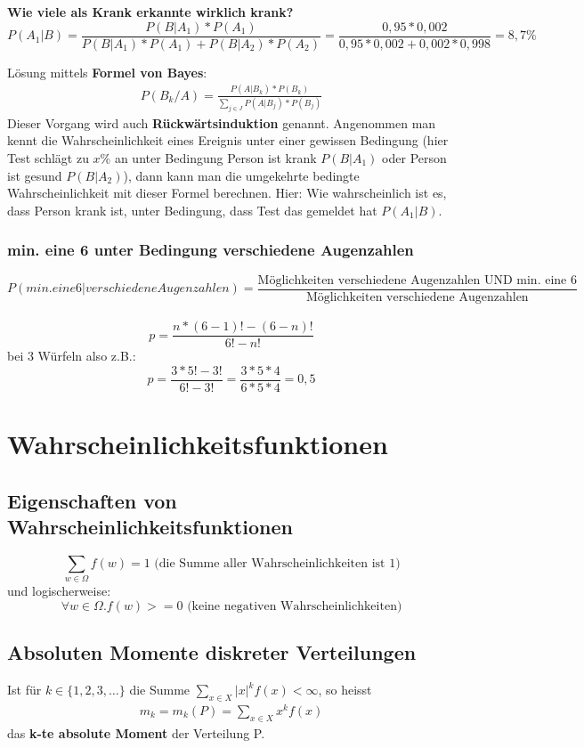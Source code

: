 \documentclass{article}
\begin{document}
	\textbf{Wie viele als Krank erkannte wirklich krank?}\\
	\[
	P(A_1 | B ) = \frac{P(B|A_1)*P(A_1)}
	{P(B|A_1)*P(A_1)+P(B| A_2)*P(A_2)} =
	\frac{0,95*0,002}{0,95*0,002+0,002*0,998} = 8,7\%
	\]
	
	\vspace*{10pt}
	
	Lösung mittels \textbf{Formel von Bayes}:
	\begin{align}
	P(B_k/A) = \frac{P(A|B_k) * P(B_k)}{\sum_{j \in J} P(A|B_j) * P(B_j)}
	\end{align}
	Dieser Vorgang wird auch \textbf{Rückwärtsinduktion} genannt. Angenommen man
	kennt die Wahrscheinlichkeit eines Ereignis unter einer gewissen Bedingung (hier Test
	schlägt zu $x\%$ an unter Bedingung Person ist krank $P(B|A_1)$ oder Person ist gesund
	$P(B|A_2)$), dann kann man die umgekehrte bedingte Wahrscheinlichkeit
	mit dieser Formel berechnen. Hier: Wie wahrscheinlich ist es, dass Person krank ist, unter
	Bedingung, dass Test das gemeldet hat $P(A_1|B)$.
	
	\subsubsection{min. eine 6 unter Bedingung verschiedene Augenzahlen}
	\[
	P(min. eine 6|verschiedene Augenzahlen) = \frac{\text{Möglichkeiten verschiedene Augenzahlen UND min. eine 6}}{\text{Möglichkeiten verschiedene Augenzahlen}}
	\]\\
	\[
	p=\frac{n*(6-1)!-(6-n)!}{6!-n!} 
	\]
	bei 3 Würfeln also z.B.:\[
	p=\frac{3*5!-3!}{6!-3!} = \frac{3*5*4}{6*5*4} = 0,5
	\]
	
	\section{Wahrscheinlichkeitsfunktionen}
	\subsection{Eigenschaften von Wahrscheinlichkeitsfunktionen}
	\[ \sum_{w \in \Omega} f(w) = 1 \text{ (die Summe aller Wahrscheinlichkeiten ist 1)}\]
	und logischerweise:
	\[ \forall w\in\Omega . f(w)>=0 \text{ (keine negativen Wahrscheinlichkeiten)} \]
	\subsection{Absoluten Momente diskreter Verteilungen}
	Ist für $k \in \{1,2,3,\ldots\}$ die Summe $\sum_{x \in X} |x|^kf(x) < \infty$,
	so heisst
	\begin{align}
	m_k = m_k(P) = \sum_{x \in X} x^kf(x)
	\end{align}
	das \textbf{k-te absolute Moment} der Verteilung P.
	
\end{document}
